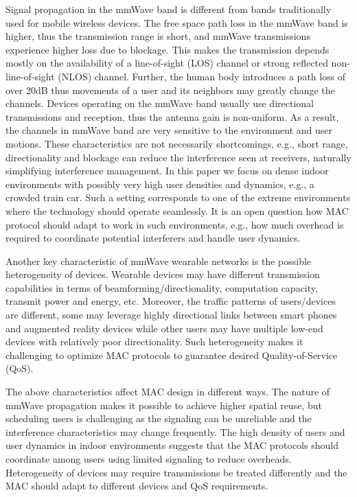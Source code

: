 \documentclass[10pt, conference, letterpaper]{IEEEtran}
\begin{document}


Signal propagation in the mmWave band is different from bands traditionally used for mobile wireless devices. 
The free space path loss in the mmWave band is higher, thus the transmission range is short, and mmWave transmissions experience higher loss due to blockage. 
This makes the transmission depends mostly on the availability of a line-of-sight (LOS) channel or strong reflected non-line-of-sight (NLOS) channel.
Further, the human body introduces a path loss of over 20dB \cite{humanshadowing} thus movements of a user and its neighbors may greatly change the channels.
Devices operating on the mmWave band usually use directional transmissions and reception, thus the antenna gain is non-uniform. 
As a result, the channels in mmWave band are very sensitive to the environment and user motions. 
These characteristics are not necessarily shortcomings, e.g., short range, directionality and blockage can reduce the interference seen at receivers, naturally simplifying interference management. 
In this paper we focus on dense indoor environments with possibly very high user densities and dynamics, e.g., a crowded train car.
Such a setting corresponds to one of the extreme environments where the technology should operate seamlessly. 
It is an open question how MAC protocol should adapt to work in such environments, e.g., how much overhead is required to coordinate potential interferers and handle user dynamics.


Another key characteristic of mmWave wearable networks is the possible heterogeneity of devices. 
Wearable devices may have different transmission capabilities in terms of beamforming/directionality, computation capacity, transmit power and energy, etc. 
Moreover, the traffic patterns of users/devices are different, some may leverage highly directional links between smart phones and augmented reality devices while other users may have multiple low-end devices with relatively poor directionality.
Such heterogeneity makes it challenging to optimize MAC protocols to guarantee desired Quality-of-Service (QoS).


The above characteristics affect MAC design in different ways. 
The nature of mmWave propagation makes it possible to achieve higher spatial reuse, but scheduling users is challenging as the signaling can be unreliable and the interference characteristics may change frequently.
The high density of users and user dynamics in indoor environments suggests that the MAC protocols should coordinate among users using limited signaling to reduce overheads. 
Heterogeneity of devices may require transmissions be treated differently and the MAC should adapt to different devices and QoS requirements.
\end{document}
